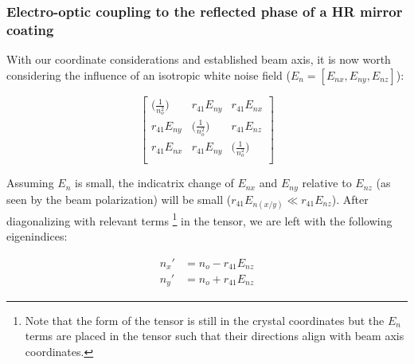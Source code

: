 \subsubsection{Electro-optic coupling to the reflected phase of a HR mirror coating}
With our coordinate considerations and established beam axis, it is now worth considering the influence of an isotropic white noise field ($E_n = [E_{nx},E_{ny},E_{nz}]$):

\begin{equation}
 \left[ {\begin{array}{ccc}
   \big( \frac{1}{n_o ^2} \big)& r_{41}E_{ny} & r_{41} E_{nx}\\
   r_{41}E_{ny} & \big( \frac{1}{n_o ^2} \big) & r_{41} E_{nz}\\
   r_{41} E_{nx} & r_{41} E_{ny} & \big( \frac{1}{n_o ^2} \big)\\
  \end{array}} \right]
\end{equation}

Assuming $E_n$ is small, the indicatrix change of $E_{nx}$ and $E_{ny}$ relative to $E_{nz}$ (as seen by the beam polarization) will be small ($r_{41}E_{n(x/y)} \ll r_{41}E_{nz}$). After diagonalizing with relevant terms \footnote{Note that the form of the tensor is still in the crystal coordinates but the $E_n$ terms are placed in the tensor such that their directions align with beam axis coordinates.} in the tensor, we are left with the following eigenindices:

\begin{equation}
\begin{aligned}
n_x' & = n_o - r_{41}E_{nz} \\
n_y' & = n_o + r_{41}E_{nz}
\end{aligned}
\end{equation}


